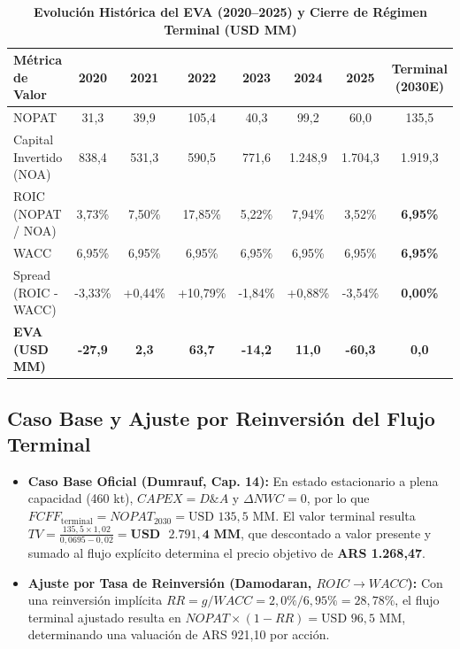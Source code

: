 \documentclass[11pt,a4paper]{article}
\begin{document}
\begin{table}[H]
\centering
\caption{\textbf{Evolución Histórica del EVA (2020--2025) y Cierre de Régimen Terminal (USD MM)}}
\scriptsize
\begin{tabularx}{\textwidth}{Xcccccc|c}
\toprule
\textbf{Métrica de Valor} & \textbf{2020} & \textbf{2021} & \textbf{2022} & \textbf{2023} & \textbf{2024} & \textbf{2025} & \textbf{Terminal (2030E)} \\
\midrule
NOPAT & 31,3 & 39,9 & 105,4 & 40,3 & 99,2 & 60,0 & 135,5 \\
Capital Invertido (NOA) & 838,4 & 531,3 & 590,5 & 771,6 & 1.248,9 & 1.704,3 & 1.919,3 \\
ROIC (NOPAT / NOA) & 3,73\% & 7,50\% & 17,85\% & 5,22\% & 7,94\% & 3,52\% & \textbf{6,95\%} \\
WACC & 6,95\% & 6,95\% & 6,95\% & 6,95\% & 6,95\% & 6,95\% & \textbf{6,95\%} \\
Spread (ROIC - WACC) & -3,33\% & +0,44\% & +10,79\% & -1,84\% & +0,88\% & -3,54\% & \textbf{0,00\%} \\
\textbf{EVA (USD MM)} & \textbf{-27,9} & \textbf{2,3} & \textbf{63,7} & \textbf{-14,2} & \textbf{11,0} & \textbf{-60,3} & \textbf{0,0} \\
\bottomrule
\end{tabularx}
\end{table}

\subsection{Caso Base y Ajuste por Reinversión del Flujo Terminal}
\begin{itemize}
    \item \textbf{Caso Base Oficial (Dumrauf, Cap. 14):} En estado estacionario a plena capacidad (460 kt), $CAPEX = D\&A$ y $\Delta NWC = 0$, por lo que $FCFF_{\text{terminal}} = NOPAT_{2030} = \text{USD } 135,5\text{ MM}$. El valor terminal resulta $TV = \frac{135,5 \times 1,02}{0,0695 - 0,02} = \mathbf{USD\text{ }2.791,4\text{ MM}}$, que descontado a valor presente y sumado al flujo explícito determina el precio objetivo de \textbf{ARS 1.268,47}.
    \item \textbf{Ajuste por Tasa de Reinversión (Damodaran, $ROIC \to WACC$):} Con una reinversión implícita $RR = g / WACC = 2,0\% / 6,95\% = 28,78\%$, el flujo terminal ajustado resulta en $NOPAT \times (1 - RR) = \text{USD } 96,5\text{ MM}$, determinando una valuación de ARS 921,10 por acción.
\end{itemize}
\end{document}
